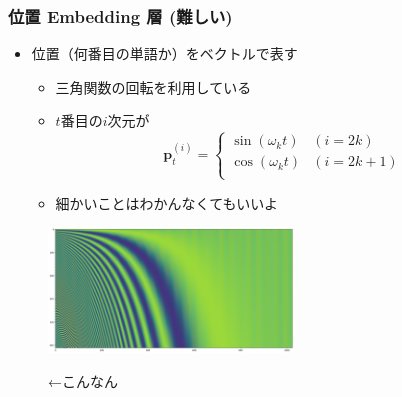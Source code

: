 \documentclass[14pt]{beamer}
\begin{document}
\begin{frame}
	\frametitle{位置 Embedding 層 {\small (難しい)}}

	\begin{itemize}
		\item 位置（何番目の単語か）をベクトルで表す
			\begin{itemize}
				\item 三角関数の回転を利用している
				\item $t$番目の$i$次元が
					\[
						\bm{p}_t^{(i)}
						=
						\begin{cases}
							\sin \left( \omega_k t \right) & (i = 2k) \\
							\cos \left( \omega_k t \right) & (i = 2k + 1) \\
						\end{cases}
					\]
				\item 細かいことはわかんなくてもいいよ
			\end{itemize}
	\end{itemize}
	\begin{figure}[H]
		\centering
		\begin{minipage}{0.15\linewidth}
			\hspace{1em}
		\end{minipage}
		\begin{minipage}{0.60\linewidth}
			\includegraphics[width=6.5cm]{posenc.png}
		\end{minipage}
		\begin{minipage}{0.15\linewidth}
			{\scriptsize ←こんなん}
		\end{minipage}
	\end{figure}
\end{frame}
\end{document}
